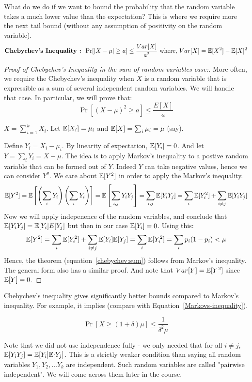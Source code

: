 \begin{description}
What do we do if we want to bound the probability that the random variable takes a much lower value than the expectation? This is where we require more the next tail bound (without any assumption of positivity on the random variable).
$$\textrm{\bf Chebychev's Inequality : } \Pr[|X-\mu| \ge a] \le \frac{Var[X]}{a^2} \textrm{ where, $Var[X] = {\mathbb E}[X^2] - {\mathbb E}[X]^2$} $$
\begin{proof}[\textit{Proof of Chebychev's Inequality in the sum of random variables case:}]
More often, we require the Chebychev's inequality when $X$ is a random variable that is expressible as a sum of several independent random variables. We will handle that case. In particular, we will prove that:
\begin{equation}
\Pr\left[ (X-\mu)^2 \ge a \right] \le \frac{E[X]}{a}
\label{chebychev:sum}
\end{equation}

$X = \sum_{i=1}^k X_i$. Let ${\mathbb E}[X_i] = \mu_i$ and ${\mathbb E}[X] = \sum_i \mu_i = \mu$ (say). 

Define $Y_i = X_i - \mu_i$. By linearity of expectation, ${\mathbb E}[Y_i] = 0$. And let $Y = \sum_i Y_i = X - \mu$. The idea is to apply Markov's inequality to a postive random variable that can be formed out of $Y$. Indeed $Y$ can take negative values, hence we can consider $Y^2$. We care about ${\mathbb E}[Y^2]$ in order to apply the Markov's inequality. 
$${\mathbb E}[Y^2] = {\mathbb E}\left[\left( \sum_i Y_i \right) \left( \sum_i Y_i \right)\right] =  {\mathbb E} \left[\sum_{i,j} Y_i Y_j \right] = \sum_{i,j} {\mathbb E}[Y_iY_j] = \sum_i {\mathbb E}[Y_i^2] + \sum_{i \neq j} {\mathbb E}[Y_iY_j] $$
Now we will apply indepenence of the random variables, and conclude that ${\mathbb E}[Y_iY_j] = {\mathbb E}[Y_i]E[Y_j]$ but then in our case ${\mathbb E}[Y_i]=0$. Using this:
$${\mathbb E}[Y^2] = \sum_i {\mathbb E}[Y_i^2] + \sum_{i \neq j} {\mathbb E}[Y_i]{\mathbb E}[Y_j] = \sum_i {\mathbb E}[Y_i^2] = \sum_i p_i(1-p_i) < \mu$$
Hence, the theorem (equation~\ref{chebychev:sum}) follows from Markov's inequality.
The general form also has a similar proof. And note that $Var[Y] = {\mathbb E}[Y^2]$ since ${\mathbb E}[Y] = 0$.
\end{proof}

Chebychev's inequality gives significantly better bounds compared to Markov's inequality. For example, it implies (compare with Equation~\ref{Markovs-inequality}).

\begin{equation}
\Pr[X \ge (1 + \delta)\mu] \le \frac{1}{\delta^2 \mu}
\label{Chebychev-inequality}
\end{equation}

\begin{remark}
Note that we did not use independence fully - we only needed that for all $i \ne j$, ${\mathbb E}[Y_iY_j] = {\mathbb E}[Y_i]{\mathbb E}_[Y_j]$. This is a strictly weaker condition than saying all random variables $Y_1, Y_2, \ldots Y_k$ are independent. Such random variables are called "pairwise independent". We will come across them later in the course.
\end{remark}


\end{description}

